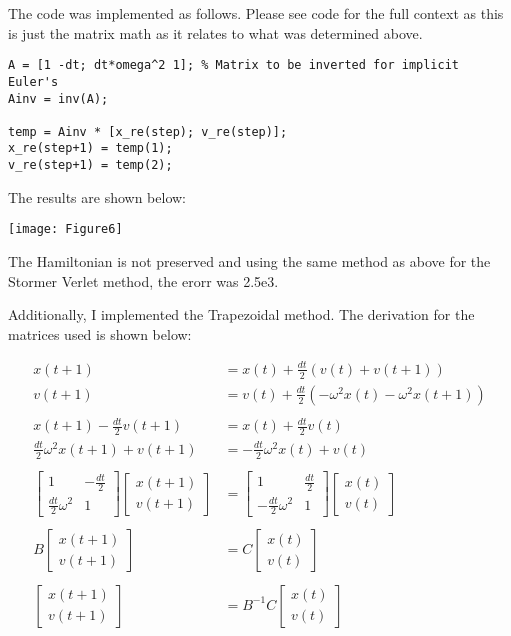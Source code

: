 \documentclass{article}
\begin{document}
The code was implemented as follows. Please see code for the full context as this is just the matrix math as it relates to what was determined above.

\begin{verbatim}
A = [1 -dt; dt*omega^2 1]; % Matrix to be inverted for implicit Euler's
Ainv = inv(A);

temp = Ainv * [x_re(step); v_re(step)];
x_re(step+1) = temp(1);
v_re(step+1) = temp(2);
\end{verbatim}

 The results are shown below:

\texttt{[image: Figure6]}

The Hamiltonian is not preserved and using the same method as above for the Stormer Verlet method, the erorr was 2.5e3.



Additionally, I implemented the Trapezoidal method. The derivation for the matrices used is shown below:

\begin{align*}
x(t+1) &= x(t) +\frac{dt}{2}( v(t) + v(t+1))\\
v(t+1) &= v(t) +\frac{dt}{2} (  -\omega^2 x(t) -\omega^2 x(t+1))\\
\\
x(t+1) - \frac{dt}{2} v(t+1)&= x(t) +\frac{dt}{2} v(t)\\
\frac{dt}{2} \omega^2 x(t+1) +  v(t+1) &= -\frac{dt}{2}\omega^2 x(t) +v(t) \\
\\
\begin{bmatrix}
1 & -\frac{dt}{2} \\ \frac{dt}{2}\omega^2& 1
\end{bmatrix}
\begin{bmatrix}
x(t+1) \\ v(t+1)
\end{bmatrix}
&= \begin{bmatrix}
1 & \frac{dt}{2} \\ -\frac{dt}{2}\omega^2  & 1
\end{bmatrix}
\begin{bmatrix}
x(t) \\ v(t)
\end{bmatrix}\\
\\
B
\begin{bmatrix}
x(t+1) \\ v(t+1)
\end{bmatrix}
&= C
\begin{bmatrix}
x(t) \\ v(t)
\end{bmatrix}\\
\\
\begin{bmatrix}
x(t+1) \\ v(t+1)
\end{bmatrix}
&= B^{-1}C
\begin{bmatrix}
x(t) \\ v(t)
\end{bmatrix}
\end{align*}
\end{document}
